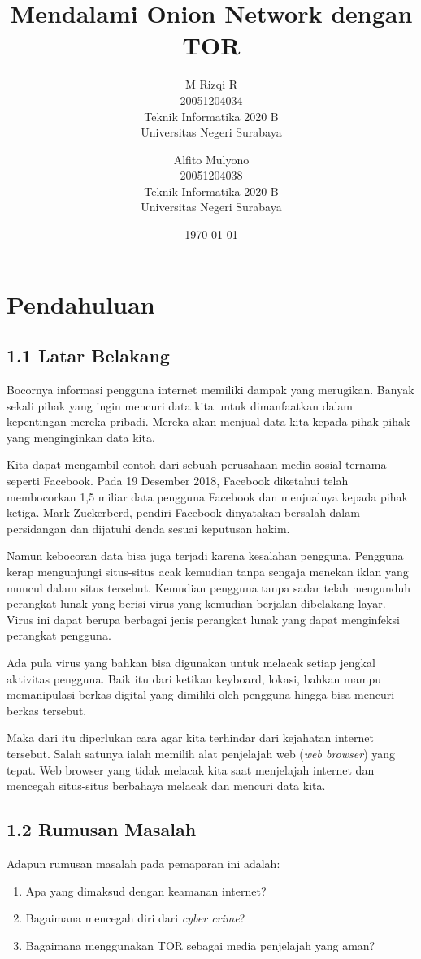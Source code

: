 \documentclass{article}
\title{\LARGE \textbf {\huge{Mendalami Onion Network dengan TOR}}}
\author{
    M Rizqi R\\
    20051204034\\
    Teknik Informatika 2020 B\\
    Universitas Negeri Surabaya\\
    \and
        Alfito Mulyono\\
        20051204038\\
        Teknik Informatika 2020 B\\
        Universitas Negeri Surabaya\\
}
\date{\today}
\begin{document}
    \maketitle
        \section{Pendahuluan}
        \subsection*{1.1 Latar Belakang}
        Bocornya informasi pengguna internet memiliki dampak yang merugikan.
        Banyak sekali pihak yang ingin mencuri data kita untuk 
        dimanfaatkan dalam kepentingan mereka pribadi. Mereka akan menjual 
        data kita kepada pihak-pihak yang menginginkan data kita.

        Kita dapat mengambil contoh dari sebuah perusahaan media sosial ternama
        seperti Facebook. Pada 19 Desember 2018, Facebook diketahui telah
        membocorkan 1,5 miliar data pengguna Facebook dan menjualnya kepada pihak ketiga.
        Mark Zuckerberd, pendiri Facebook dinyatakan bersalah dalam persidangan 
        dan dijatuhi denda sesuai keputusan hakim.

        Namun kebocoran data bisa juga terjadi karena kesalahan pengguna.
        Pengguna kerap mengunjungi situs-situs acak kemudian tanpa
        sengaja menekan iklan yang muncul dalam situs tersebut. 
        Kemudian pengguna tanpa sadar telah mengunduh perangkat
        lunak yang berisi virus yang kemudian berjalan dibelakang layar.
        Virus ini dapat berupa berbagai jenis perangkat lunak yang dapat
        menginfeksi perangkat pengguna.

        Ada pula virus yang bahkan bisa digunakan untuk melacak setiap jengkal
        aktivitas pengguna. Baik itu dari ketikan keyboard, lokasi, bahkan mampu memanipulasi
        berkas digital yang dimiliki oleh pengguna hingga bisa mencuri berkas tersebut.

        Maka dari itu diperlukan cara agar kita terhindar dari kejahatan internet tersebut.
        Salah satunya ialah memilih alat penjelajah web (\textit{web browser}) yang tepat.
        Web browser yang tidak melacak kita saat menjelajah internet dan mencegah
        situs-situs berbahaya melacak dan mencuri data kita.
        \subsection*{1.2 Rumusan Masalah}
        \noindent Adapun rumusan masalah pada pemaparan ini adalah:
        \begin{enumerate}
            \item Apa yang dimaksud dengan keamanan internet?
            \item Bagaimana mencegah diri dari \textit{cyber crime}?
            \item Bagaimana menggunakan TOR sebagai media penjelajah yang aman?
        \end{enumerate}
\end{document}
